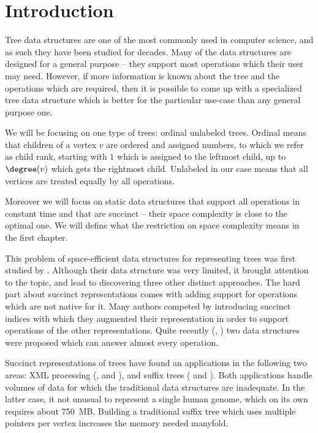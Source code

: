 \chapter*{Introduction}

Tree data structures are one of the most commonly used in computer science, and as such they have been studied for decades.
Many of the data structures are designed for a general purpose -- they support most operations which their user may need.
However, if more information is known about the tree and the operations which are required, then it is possible to come up with a specialized tree data structure which is better for the particular use-case than any general purpose one.

We will be focusing on one type of trees: ordinal unlabeled trees.
Ordinal means that children of a vertex $v$ are ordered and assigned numbers, to which we refer as child rank, starting with $1$ which is assigned to the leftmost child, up to $\degree(v)$ which gets the rightmost child.
Unlabeled in our case means that all vertices are treated equally by all operations.

Moreover we will focus on static data structures that support all operations in constant time and that are succinct -- their space complexity is close to the optimal one.
We will define what the restriction on space complexity means in the first chapter.

\bigbreak

This problem of space-efficient data structures for representing trees was first studied by \cite{jacobson1989space}.
Although their data structure was very limited, it brought attention to the topic, and lead to discovering three other distinct approaches.
The hard part about succinct representations comes with adding support for operations which are not native for it.
Many authors competed by introducing succinct indices with which they augmented their representation in order to support operations of the other representations.
Quite recently (\cite{farzan2008uniform}, \cite{sadakane2010fully}) two data structures were proposed which can answer almost every operation.

Succinct representations of trees have found an applications in the following two areas: XML processing (\cite{geary2006succinct},\cite{lu2008balanced} and \cite{delpratt2008engineering}), and suffix trees (\cite{jansson2012ultra} and \cite{munro2001space}).
Both applications handle volumes of data for which the traditional data structures are inadequate.
In the latter case, it not unusual to represent a single human genome, which on its own requires about 750~MB.
Building a traditional suffix tree which uses multiple pointers per vertex increases the memory needed manyfold.

